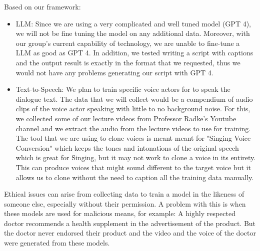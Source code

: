 \documentclass[conference]{IEEEtran}
\begin{document}
Based on our framework:
\begin{itemize}
    \item LLM: Since we are using a very complicated and well tuned model (GPT 4), we will not be fine tuning the model on any additional data. Moreover, with our group's current capability of technology, we are unable to fine-tune a LLM as good as GPT 4. In addition, we tested writing a script with captions and the output result is exactly in the format that we requested, thus we would not have any problems generating our script with GPT 4.
    \item Text-to-Speech: We plan to train specific voice actors for to speak the dialogue text.
    The data that we will collect would be a compendium of audio clips of the voice actor speaking
    with little to no background noise.
    For this, we collected some of our lecture videos from Professor Radke's Youtube channel
    and we extract the audio from the lecture videos to use for training.
    The tool that we are using to clone voices is meant meant for "Singing Voice Conversion" which keeps the tones and intonations of the
    original speech which is great for Singing, but it may not work to clone a voice
    in its entirety. This can produce voices that might sound different to the target voice but it allows us to clone 
    without the need to caption all the training data manually.
\end{itemize}
Ethical issues can arise from collecting data to train a model in the likeness of someone else, especially without their permission.
A problem with this is when these models are used for malicious means, for example: A highly respected doctor recommends a
health supplement in the advertisement of the product. But the doctor never endorsed their product and 
the video and the voice of the doctor were generated from these models.
\end{document}
